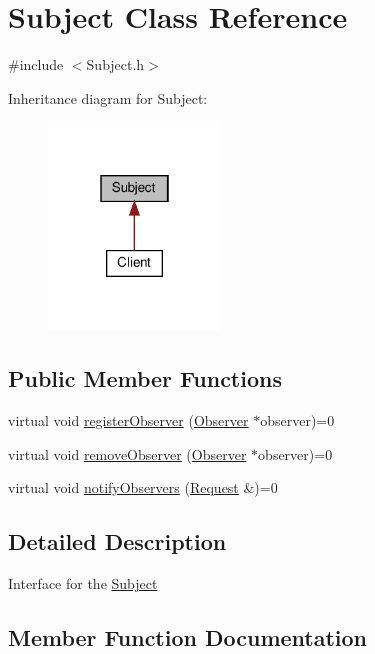\hypertarget{classSubject}{}\section{Subject Class Reference}
\label{classSubject}


{\ttfamily \#include $<$Subject.\+h$>$}



Inheritance diagram for Subject\+:\nopagebreak
\begin{figure}[H]
\begin{center}
\leavevmode
\includegraphics[width=130pt]{classSubject__inherit__graph}
\end{center}
\end{figure}
\subsection*{Public Member Functions}
\begin{DoxyCompactItemize}
\item 
virtual void \hyperlink{classSubject_ae3f8d320b19b7d0fe695a3b4e7660002}{register\+Observer} (\hyperlink{classObserver}{Observer} $\ast$observer)=0
\item 
virtual void \hyperlink{classSubject_a86699df0364a9091d1887f344255e9ff}{remove\+Observer} (\hyperlink{classObserver}{Observer} $\ast$observer)=0
\item 
virtual void \hyperlink{classSubject_ad779772e3bcf5b3bd8f7a96b10531920}{notify\+Observers} (\hyperlink{classRequest}{Request} \&)=0
\end{DoxyCompactItemize}


\subsection{Detailed Description}
Interface for the \hyperlink{classSubject}{Subject} 

\subsection{Member Function Documentation}
\mbox{\label{classSubject_ad779772e3bcf5b3bd8f7a96b10531920}} 
